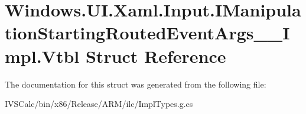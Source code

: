 \hypertarget{struct_windows_1_1_u_i_1_1_xaml_1_1_input_1_1_i_manipulation_starting_routed_event_args_____impl_1_1_vtbl}{}\section{Windows.\+U\+I.\+Xaml.\+Input.\+I\+Manipulation\+Starting\+Routed\+Event\+Args\+\_\+\+\_\+\+Impl.\+Vtbl Struct Reference}
\label{struct_windows_1_1_u_i_1_1_xaml_1_1_input_1_1_i_manipulation_starting_routed_event_args_____impl_1_1_vtbl}


The documentation for this struct was generated from the following file\+:\begin{DoxyCompactItemize}
\item 
I\+V\+S\+Calc/bin/x86/\+Release/\+A\+R\+M/ilc/Impl\+Types.\+g.\+cs\end{DoxyCompactItemize}
